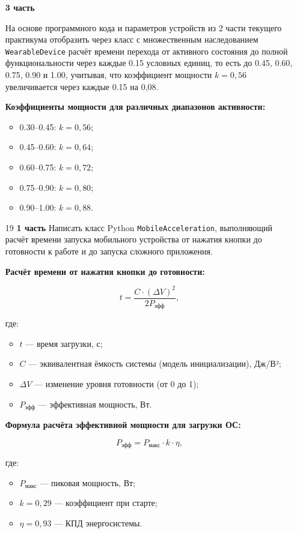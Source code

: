 \begin{enumerate}
\textbf{3 часть}

На основе программного кода и параметров устройств из 2 части текущего практикума отобразить через класс с множественным наследованием \texttt{WearableDevice} расчёт времени перехода от активного состояния до полной функциональности через каждые 0.15 условных единиц, то есть до 0.45, 0.60, 0.75, 0.90 и 1.00, учитывая, что коэффициент мощности $k = 0{,}56$ увеличивается через каждые 0.15 на 0{,}08.

\textbf{Коэффициенты мощности для различных диапазонов активности:}
\begin{itemize}
    \item 0.30–0.45: $k = 0{,}56$;  
    \item 0.45–0.60: $k = 0{,}64$;  
    \item 0.60–0.75: $k = 0{,}72$;  
    \item 0.75–0.90: $k = 0{,}80$;  
    \item 0.90–1.00: $k = 0{,}88$.  
\end{itemize}


\item[19] \textbf{1 часть}  
Написать класс Python \texttt{MobileAcceleration}, выполняющий расчёт времени запуска мобильного устройства от нажатия кнопки до готовности к работе и до запуска сложного приложения.

\textbf{Расчёт времени от нажатия кнопки до готовности:}

\begin{equation}
t = \frac{C \cdot (\Delta V)^2}{2P_{\text{эфф}}},
\end{equation}

где:  
\begin{itemize}
    \item $t$ — время загрузки, с;  
    \item $C$ — эквивалентная ёмкость системы (модель инициализации), Дж/В²;  
    \item $\Delta V$ — изменение уровня готовности (от 0 до 1);  
    \item $P_{\text{эфф}}$ — эффективная мощность, Вт.  
\end{itemize}

\textbf{Формула расчёта эффективной мощности для загрузки ОС:}

\begin{equation}
P_{\text{эфф}} = P_{\text{макс}} \cdot k \cdot \eta,
\end{equation}

где:  
\begin{itemize}
    \item $P_{\text{макс}}$ — пиковая мощность, Вт;  
    \item $k = 0{,}29$ — коэффициент при старте;  
    \item $\eta = 0{,}93$ — КПД энергосистемы.  
\end{itemize}


\end{enumerate}
